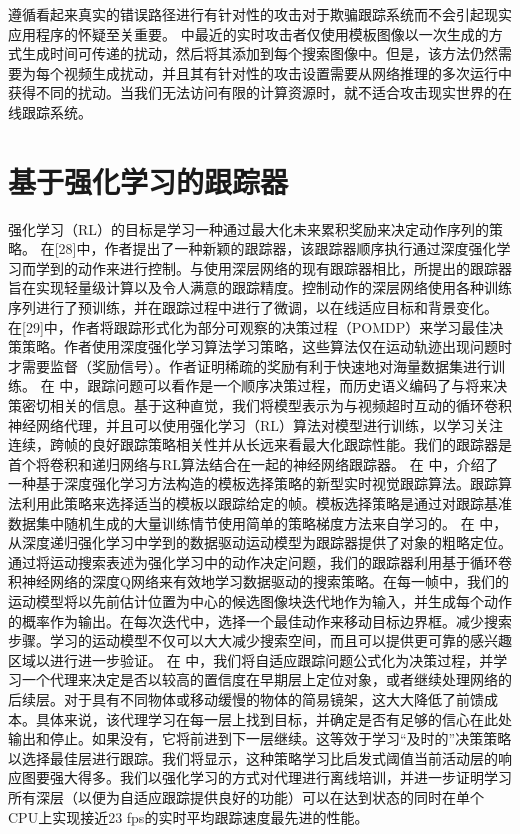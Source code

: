 遵循看起来真实的错误路径进行有针对性的攻击对于欺骗跟踪系统而不会引起现实应用程序的怀疑至关重要。
\cite{TTP} 中最近的实时攻击者仅使用模板图像以一次生成的方式生成时间可传递的扰动，然后将其添加到每个搜索图像中。但是，该方法仍然需要为每个视频生成扰动，并且其有针对性的攻击设置需要从网络推理的多次运行中获得不同的扰动。当我们无法访问有限的计算资源时，就不适合攻击现实世界的在线跟踪系统。
\section{基于强化学习的跟踪器}
强化学习（RL）的目标是学习一种通过最大化未来累积奖励来决定动作序列的策略。
在[28]中，作者提出了一种新颖的跟踪器，该跟踪器顺序执行通过深度强化学习而学到的动作来进行控制。与使用深层网络的现有跟踪器相比，所提出的跟踪器旨在实现轻量级计算以及令人满意的跟踪精度。控制动作的深层网络使用各种训练序列进行了预训练，并在跟踪过程中进行了微调，以在线适应目标和背景变化。 %
在[29]中，作者将跟踪形式化为部分可观察的决策过程（POMDP）来学习最佳决策策略。作者使用深度强化学习算法学习策略，这些算法仅在运动轨迹出现问题时才需要监督（奖励信号）。作者证明稀疏的奖励有利于快速地对海量数据集进行训练。 %
在 \cite{DeepReinforcement} 中，跟踪问题可以看作是一个顺序决策过程，而历史语义编码了与将来决策密切相关的信息。基于这种直觉，我们将模型表示为与视频超时互动的循环卷积神经网络代理，并且可以使用强化学习（RL）算法对模型进行训练，以学习关注连续，跨帧的良好跟踪策略相关性并从长远来看最大化跟踪性能。我们的跟踪器是首个将卷积和递归网络与RL算法结合在一起的神经网络跟踪器。%
在 \cite{RealTimeVisual} 中，介绍了一种基于深度强化学习方法构造的模板选择策略的新型实时视觉跟踪算法。跟踪算法利用此策略来选择适当的模板以跟踪给定的帧。模板选择策略是通过对跟踪基准数据集中随机生成的大量训练情节使用简单的策略梯度方法来自学习的。%
在 \cite{HierarchicalTracking} 中，从深度递归强化学习中学到的数据驱动运动模型为跟踪器提供了对象的粗略定位。通过将运动搜索表述为强化学习中的动作决定问题，我们的跟踪器利用基于循环卷积神经网络的深度Q网络来有效地学习数据驱动的搜索策略。在每一帧中，我们的运动模型将以先前估计位置为中心的候选图像块迭代地作为输入，并生成每个动作的概率作为输出。在每次迭代中，选择一个最佳动作来移动目标边界框。减少搜索步骤。学习的运动模型不仅可以大大减少搜索空间，而且可以提供更可靠的感兴趣区域以进行进一步验证。%
在 \cite{LearningPolicies} 中，我们将自适应跟踪问题公式化为决策过程，并学习一个代理来决定是否以较高的置信度在早期层上定位对象，或者继续处理网络的后续层。对于具有不同物体或移动缓慢的物体的简易镜架，这大大降低了前馈成本。具体来说，该代理学习在每一层上找到目标，并确定是否有足够的信心在此处输出和停止。如果没有，它将前进到下一层继续。这等效于学习“及时的”决策策略以选择最佳层进行跟踪。我们将显示，这种策略学习比启发式阈值当前活动层的响应图要强大得多。我们以强化学习的方式对代理进行离线培训，并进一步证明学习所有深层（以便为自适应跟踪提供良好的功能）可以在达到状态的同时在单个CPU上实现接近23 fps的实时平均跟踪速度最先进的性能。%
